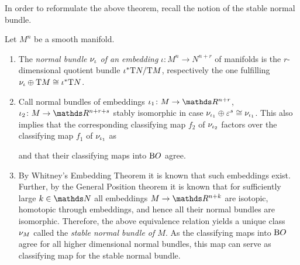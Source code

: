 In order to reformulate the above theorem, recall the notion of the
stable normal bundle. 
\begin{LemDef}
  Let $M^n$ be a smooth manifold.
  \begin{enumerate}
  \item
    The \emph{normal bundle $\nu_{\iota}$ of an embedding}
    $\iota\colon M^n\to N^{n+r}$ of manifolds is the $r$-dimensional
    quotient bundle ${\iota}^*\mathrm{T}N/\mathrm{T}M$, respectively the one
    fulfilling $\nu_{\iota}\oplus\mathrm{T}M\cong{\iota}^*\mathrm{T}N$.
  \item 
    Call normal bundles of embeddings
    $\iota_1\colon M\to\R^{n+r}$, $\iota_2\colon M\to\R^{n+r+s}$
    stably isomorphic in case
    $\nu_{\iota_1}\oplus\varepsilon^{s}\cong\nu_{\iota_1}$.
    This also implies that the corresponding classifying map $f_2$ of
    $\nu_{\iota_2}$ factors over the classifying map $f_1$ of
    $\nu_{\iota_1}$ as   
    \begin{center}
      and that their classifying maps into $\mathrm{B}O$ agree.
    \end{center}
  \item 
    By Whitney's Embedding Theorem %
    it is known that such embeddings exist.
    Further, by \forexample the General Position theorem
    \cite[Chap.~2]{embeddingsummary}
    it is known that for sufficiently large $k\in\Nat$ all embeddings
    $M\to\R^{n+k}$ are isotopic, \idest homotopic through embeddings,
    and hence all their normal bundles are isomorphic.
    Therefore, the above equivalence relation yields a unique class
    $\nu_{M}$ called the \emph{stable normal bundle of $M$}.
    As the classifying maps into $\mathrm{B}O$ agree for all higher
    dimensional normal bundles, this map can serve as classifying map
    for the stable normal bundle.
 \end{enumerate}
\end{LemDef}

